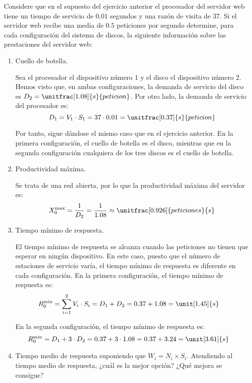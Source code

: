 \begin{ejercicio}\label{ej:5.16}
    Considere que en el supuesto del ejercicio anterior el procesador del servidor web tiene un tiempo de servicio de $0.01$ segundos y una razón de visita de 37. Si el servidor web recibe una media de $0.5$ peticiones por segundo determine, para cada configuración del sistema de discos, la siguiente información sobre las prestaciones del servidor web:
    \begin{enumerate}
        \item Cuello de botella.
        
        Sea el procesador el dispositivo número 1 y el disco el dispositivo número 2. Hemos visto que, en ambas configuraciones, la demanda de servicio del disco es $D_2 = \unitfrac[1.08]{s}{peticion}$. Por otro lado, la demanda de servicio del procesador es:
        \begin{equation*}
            D_1 = V_1 \cdot S_1 = 37 \cdot 0.01 = \unitfrac[0.37]{s}{peticion}
        \end{equation*}

        Por tanto, sigue dándose el mismo caso que en el ejercicio anterior. En la primera configuración, el cuello de botella es el disco, mientras que en la segunda configuración cualquiera de los tres discos es el cuello de botella.
        \item Productividad máxima.
        
        Se trata de una red abierta, por lo que la productividad máxima del servidor es:
        \begin{equation*}
            X_0^{\text{max}} = \dfrac{1}{D_2} = \dfrac{1}{1.08} \approx \unitfrac[0.926]{peticiones}{s}
        \end{equation*}
        \item Tiempo mínimo de respuesta.
        
        El tiempo mínimo de respuesta se alcanza cuando las peticiones no tienen que esperar en ningún dispositivo. En este caso, puesto que el número de estaciones de servicio varía, el tiempo mínimo de respuesta es diferente en cada configuración. En la primera configuración, el tiempo mínimo de respuesta es:
        \begin{align*}
            R_0^{\text{min}} &= \sum_{i=1}^{2} V_i \cdot S_i = D_1 + D_2 = 0.37 + 1.08 = \unit[1.45]{s}
        \end{align*}

        En la segunda configuración, el tiempo mínimo de respuesta es:
        \begin{align*}
            R_0^{\text{min}} &= D_1 + 3\cdot D_2 = 0.37 + 3 \cdot 1.08 = 0.37 + 3.24 = \unit[3.61]{s}
        \end{align*}
        \item Tiempo medio de respuesta suponiendo que $W_i = N_i \times S_i$. 
        Atendiendo al tiempo medio de respuesta, ¿cuál es la mejor opción? ¿Qué mejora se consigue?
        

\end{enumerate}
\end{ejercicio}
